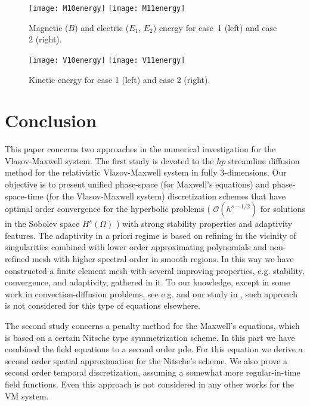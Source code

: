 \documentclass[reqno,a4paper]{amsart}
\theoremstyle{remark}
\numberwithin{equation}{section}
\begin{document}
\begin{figure}[!h]
\centerline{
\texttt{[image: M10energy]}
\texttt{[image: M11energy]}
}
\caption{Magnetic ($B$) and electric ($E_1$, $E_2$) energy for case~1 (left)
and case 2 (right).}
\label{fig1}
\end{figure}

\begin{figure}[!h]
\centerline{
\texttt{[image: V10energy]}
\texttt{[image: V11energy]}
}
\caption{Kinetic energy for case 1 (left) and case 2 (right).}
\label{fig2}
\end{figure}


\section{Conclusion} 
This paper concerns two approaches in the numerical investigation for the 
Vlasov-Maxwell system.  
The first study is devoted to the $hp$ streamline diffusion method for the 
relativistic Vlasov-Maxwell system in fully 3-dimensions. 
Our objective is to present unified phase-space (for Maxwell's equations) 
and phase-space-time (for the Vlasov-Maxwell system) discretization schemes  
that have optimal order convergence for the hyperbolic problems 
( ${\mathcal O}(h^{s-1/2})$ for solutions in the Sobolev space $H^s(\Omega)$ ) 
with strong stability properties and adaptivity features. 
The adaptivity in a priori regime is based on refining in the vicinity of 
singularities combined with lower order approximating polynomials and 
non-refined mesh with higher spectral order in smooth regions. 
In this way we have constructed a finite 
element mesh with several improving properties, e.g. 
stability, convergence, and adaptivity, gathered in it. To our knowledge, 
except in some work in convection-diffusion problems, see e.g. 
\cite{Suli_etal} and our study in \cite{AsadSopas}, such approach 
is not considered for this type of equations elsewhere. 

The second study concerns a penalty method for the Maxwell's equations, which 
is based on a certain Nitsche type symmetrization scheme. In this part we have
combined the field equations to a second order pde. For this equation 
 we derive a second order spatial approximation for the Nitsche's scheme. 
We also prove a second order temporal discretization, 
 assuming a somewhat more regular-in-time field functions. Even this approach 
is not considered in any other works for the VM system. 
\end{document}
